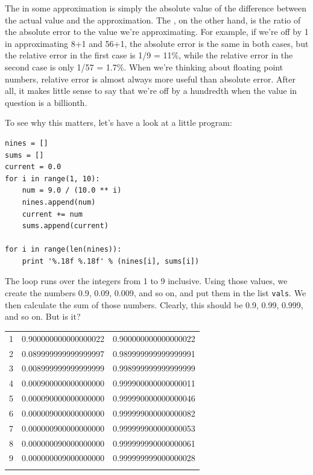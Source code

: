 \documentclass{book}
\begin{document}
The  in some approximation is
simply the absolute value of the difference between the actual value and
the approximation. The , on
the other hand, is the ratio of the absolute error to the value we're
approximating. For example, if we're off by 1 in approximating 8+1 and
56+1, the absolute error is the same in both cases, but the relative
error in the first case is 1/9 = 11\%, while the relative error in the
second case is only 1/57 = 1.7\%. When we're thinking about floating
point numbers, relative error is almost always more useful than absolute
error. After all, it makes little sense to say that we're off by a
hundredth when the value in question is a billionth.

To see why this matters, let's have a look at a little program:

\begin{verbatim}
nines = []
sums = []
current = 0.0
for i in range(1, 10):
    num = 9.0 / (10.0 ** i)
    nines.append(num)
    current += num
    sums.append(current)

for i in range(len(nines)):
    print '%.18f %.18f' % (nines[i], sums[i])
\end{verbatim}

The loop runs over the integers from 1 to 9 inclusive. Using those
values, we create the numbers 0.9, 0.09, 0.009, and so on, and put them
in the list \texttt{vals}. We then calculate the sum of those numbers.
Clearly, this should be 0.9, 0.99, 0.999, and so on. But is it?

\begin{tabular}{@{}lll@{}}
\hline\noalign{\medskip}
1 & 0.900000000000000022 & 0.900000000000000022
\\\noalign{\medskip}
2 & 0.089999999999999997 & 0.989999999999999991
\\\noalign{\medskip}
3 & 0.008999999999999999 & 0.998999999999999999
\\\noalign{\medskip}
4 & 0.000900000000000000 & 0.999900000000000011
\\\noalign{\medskip}
5 & 0.000090000000000000 & 0.999990000000000046
\\\noalign{\medskip}
6 & 0.000009000000000000 & 0.999999000000000082
\\\noalign{\medskip}
7 & 0.000000900000000000 & 0.999999900000000053
\\\noalign{\medskip}
8 & 0.000000090000000000 & 0.999999990000000061
\\\noalign{\medskip}
9 & 0.000000009000000000 & 0.999999999000000028
\\\noalign{\medskip}
\hline
\end{tabular}
\end{document}
